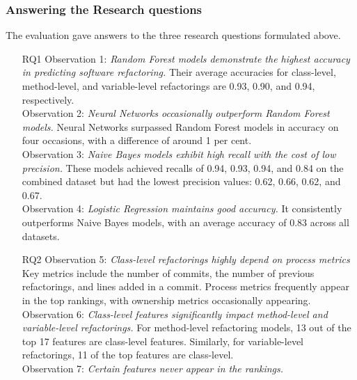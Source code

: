 \subsubsection{Answering the Research questions}
The evaluation gave answers to the three research questions formulated above.
\begin{itemize}
    \item[RQ1] Observation 1: \textit{Random Forest models demonstrate the highest accuracy in predicting software refactoring.} Their average accuracies for class-level, method-level, and variable-level refactorings are 0.93, 0.90, and 0.94, respectively.\\Observation 2: \textit{Neural Networks occasionally outperform Random Forest models.} Neural Networks surpassed Random Forest models in accuracy on four occasions, with a difference of around 1 per cent.\\ Observation 3: \textit{Naive Bayes models exhibit high recall with the cost of low precision.} These models achieved recalls of 0.94, 0.93, 0.94, and 0.84 on the combined dataset but had the lowest precision values: 0.62, 0.66, 0.62, and 0.67.\\ Observation 4: \textit{Logistic Regression maintains good accuracy.} It consistently outperforms Naive Bayes models, with an average accuracy of 0.83 across all datasets.
    \item[RQ2] Observation 5: \textit{Class-level refactorings highly depend on process metrics} Key metrics include the number of commits, the number of previous refactorings, and lines added in a commit. Process metrics frequently appear in the top rankings, with ownership metrics occasionally appearing.\\ Observation 6: \textit{Class-level features significantly impact method-level and variable-level refactorings.} For method-level refactoring models, 13 out of the top 17 features are class-level features. Similarly, for variable-level refactorings, 11 of the top features are class-level.\\ Observation 7: \textit{Certain features never appear in the rankings.}

\end{itemize}
